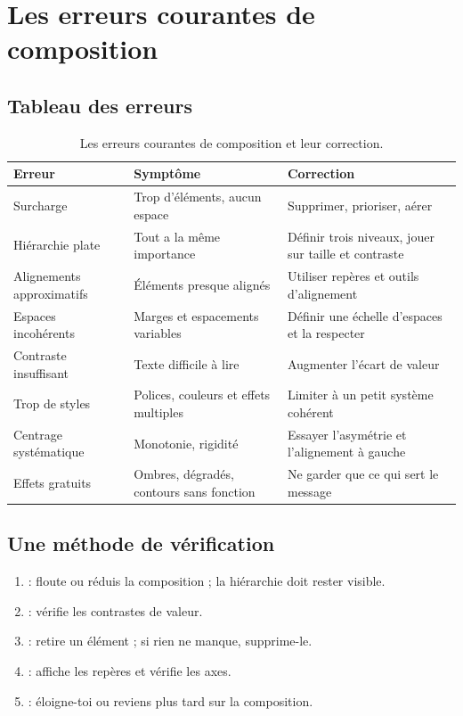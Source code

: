 \section{Les erreurs courantes de composition}

\subsection{Tableau des erreurs}

\begin{table}[h!]
\centering
\begin{tabular}{@{}p{3.5cm}p{4.8cm}p{5.7cm}@{}}
\toprule
\textbf{Erreur} & \textbf{Symptôme} & \textbf{Correction} \\
\midrule
Surcharge & Trop d'éléments, aucun espace & Supprimer, prioriser, aérer \\
Hiérarchie plate & Tout a la même importance & Définir trois niveaux, jouer sur taille et contraste \\
Alignements approximatifs & Éléments presque alignés & Utiliser repères et outils d'alignement \\
Espaces incohérents & Marges et espacements variables & Définir une échelle d'espaces et la respecter \\
Contraste insuffisant & Texte difficile à lire & Augmenter l'écart de valeur \\
Trop de styles & Polices, couleurs et effets multiples & Limiter à un petit système cohérent \\
Centrage systématique & Monotonie, rigidité & Essayer l'asymétrie et l'alignement à gauche \\
Effets gratuits & Ombres, dégradés, contours sans fonction & Ne garder que ce qui sert le message \\
\bottomrule
\end{tabular}
\caption{Les erreurs courantes de composition et leur correction.}
\end{table}

\subsection{Une méthode de vérification}

\begin{enumerate}
  \item {} : floute ou réduis la composition ; la hiérarchie doit rester visible.
  \item {} : vérifie les contrastes de valeur.
  \item {} : retire un élément ; si rien ne manque, supprime-le.
  \item {} : affiche les repères et vérifie les axes.
  \item {} : éloigne-toi ou reviens plus tard sur la composition.
\end{enumerate}

